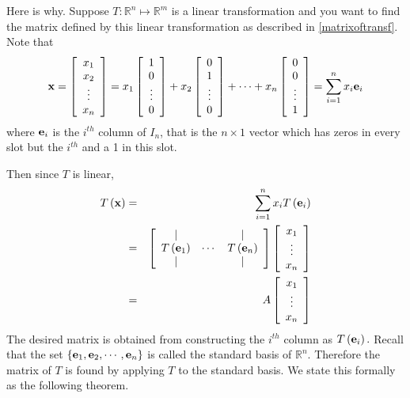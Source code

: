 Here is why. Suppose $T:\mathbb{R}^{n}\mapsto \mathbb{R}^{m}$ is a linear transformation and you want to find
the matrix defined by this linear transformation as described in \ref{matrixoftransf}.
 Note that
\begin{equation*}
{\bf x} =\left[
\begin{array}{c}
x_{1} \\
x_{2} \\
\vdots \\
x_{n}
\end{array}
\right] = x_{1}\left[
\begin{array}{c}
1 \\
0 \\
\vdots \\
0
\end{array}
\right] + x_{2}\left[
\begin{array}{c}
0 \\
1 \\
\vdots \\
0
\end{array}
\right] +\cdots + x_{n}\left[
\begin{array}{c}
0 \\
0 \\
\vdots \\
1
\end{array}
\right] = \sum_{i=1}^{n}x_{i}{\bf e}_{i}
\end{equation*}
where ${\bf e}_{i}$ is the $i^{th}$ column of $I_n$, that is the $n \times
1$ vector which has zeros in every slot but the $i^{th}$ and a 1 in
this slot.

Then since $T$ is linear,
\begin{eqnarray*}
T\left( {\bf x} \right)&=&\sum_{i=1}^{n}x_{i}T\left( {\bf e}_{i}\right) \\
&=&\left[
\begin{array}{ccc}
| &  & | \\
T\left( {\bf e}_{1}\right) & \cdots & T\left( {\bf e}_{n}\right) \\
| &  & |
\end{array}
\right] \left[
\begin{array}{c}
x_{1} \\
\vdots \\
x_{n}
\end{array}
\right] \\
&=& A\left[
\begin{array}{c}
x_{1} \\
\vdots \\
x_{n}
\end{array}
\right]
\end{eqnarray*}
The desired matrix is obtained from constructing the $i^{th}$
column as $T\left( {\bf e}_{i}\right) .$ Recall that the set $\left\{ {\bf e}_1, {\bf e}_2, \cdots, {\bf e}_n \right\}$ is called the standard basis of $\mathbb{R}^n$. Therefore the matrix of $T$ is found by applying $T$ to the standard basis. We state this formally as the
following theorem.

